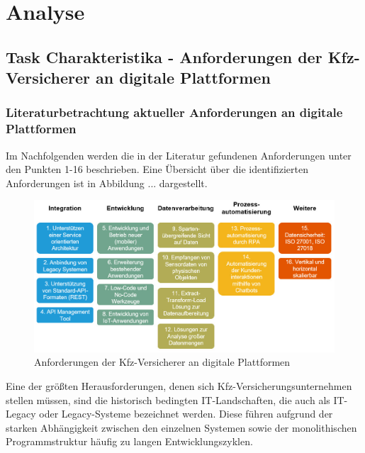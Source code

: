 \chapter{Analyse}
\section{Task Charakteristika - Anforderungen der Kfz-Versicherer an digitale Plattformen}

\subsection{Literaturbetrachtung aktueller Anforderungen an digitale Plattformen}



Im Nachfolgenden werden die in der Literatur gefundenen Anforderungen unter den Punkten 1-16 beschrieben. Eine Übersicht über die identifizierten Anforderungen ist in Abbildung ... dargestellt.

\begin{figure}[h]
    \centering
    \includegraphics[width=1\textwidth]{img/PP_Anforderungen.jpg}
    \caption[Anforderungen der Kfz-Versicherer an digitale Plattformen]{Anforderungen der Kfz-Versicherer an digitale Plattformen\autocite{PPAnf}}
    \label{fig:PPAnf}
\end{figure}

Eine der größten Herausforderungen, denen sich Kfz-Versicherungsunternehmen stellen müssen, sind die historisch bedingten IT-Landschaften, die auch als IT-Legacy oder Legacy-Systeme bezeichnet werden. Diese führen aufgrund der starken Abhängigkeit zwischen den einzelnen Systemen sowie der monolithischen Programmstruktur häufig zu langen Entwicklungszyklen. \autocite[Vgl.][S. 10-12]{GUNTER2020}

